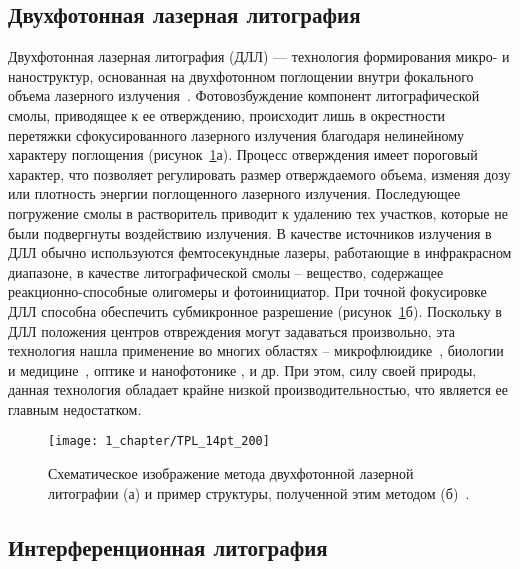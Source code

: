 \subsection{Двухфотонная лазерная литография}

Двухфотонная лазерная литография (ДЛЛ) — технология формирования микро- и наноструктур, основанная на двухфотонном поглощении внутри фокального объема лазерного излучения~\cite{Hohmann2015, Kawata2001}. Фотовозбуждение компонент литографической смолы, приводящее к ее отверждению, происходит лишь в окрестности перетяжки сфокусированного лазерного излучения благодаря нелинейному характеру поглощения (рисунок~\ref{fig:TPL}а). Процесс отверждения имеет пороговый характер, что позволяет регулировать размер отверждаемого объема, изменяя дозу или плотность энергии поглощенного лазерного излучения. Последующее погружение смолы в растворитель приводит к удалению тех участков, которые не были подвергнуты воздействию излучения. В качестве источников излучения в ДЛЛ обычно используются фемтосекундные лазеры, работающие в инфракрасном диапазоне, в качестве литографической смолы -- вещество, содержащее реакционно-способные олигомеры и фотоинициатор. При точной фокусировке ДЛЛ способна обеспечить субмикронное разрешение (рисунок~\ref{fig:TPL}б). Поскольку в ДЛЛ положения центров отвреждения могут задаваться произвольно, эта технология нашла применение во многих областях -- микрофлюидике~\cite{TPL_microfluidics_1, TPL_microfluidics_2}, биологии и \linebreak медицине~\cite{TPL_biology_1, TPL_biology_2}, оптике и нанофотонике \cite{TPL_optics, TPL_nanophotonics}, и др. При этом, силу своей природы, данная технология обладает крайне низкой производительностью, что является ее главным недостатком.

\begin{figure}[h]
	\centering
	\texttt{[image: 1\_chapter/TPL\_14pt\_200]}
	\vspace{1em}
	\caption{Схематическое изображение метода двухфотонной лазерной литографии (а) и пример структуры, полученной этим методом (б)~\cite{TPL_castle}.}
	\label{fig:TPL}
\end{figure}


\subsection{Интерференционная литография}

